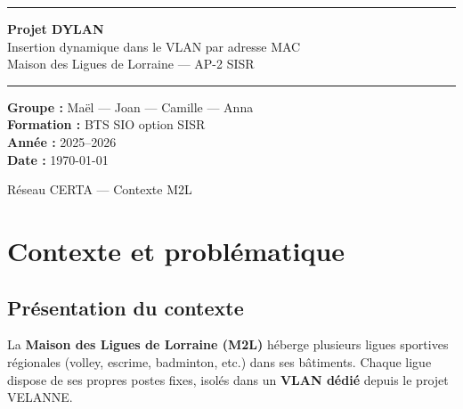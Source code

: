 \documentclass[a4paper,12pt]{article}
\begin{document}
\thispagestyle{empty}

\begin{center}
  \vspace*{2cm}
  {\color{primary}\rule{\textwidth}{2pt}}
  \vspace{0.8em}

  {\Huge\bfseries\sffamily\color{primary} Projet DYLAN}\\[0.4em]
  {\Large\sffamily\color{darkgray} Insertion dynamique dans le VLAN par adresse MAC}\\[0.2em]
  {\normalsize\color{darkgray} Maison des Ligues de Lorraine — AP-2 SISR}

  \vspace{0.8em}
  {\color{primary}\rule{\textwidth}{2pt}}

  \vspace{2cm}

  \begin{tcolorbox}[colback=lightgray, colframe=primary!30, sharp corners, width=0.7\textwidth]
    \centering
    \textbf{Groupe :} Maël — Joan — Camille — Anna\\[0.3em]
    \textbf{Formation :} BTS SIO option SISR\\[0.3em]
    \textbf{Année :} 2025–2026\\[0.3em]
    \textbf{Date :} \today
  \end{tcolorbox}
\end{center}

\vfill
{\small\color{darkgray}\centering Réseau CERTA — Contexte M2L\par}

\newpage
\tableofcontents
\newpage

\section{Contexte et problématique}

\subsection{Présentation du contexte}

La \textbf{Maison des Ligues de Lorraine (M2L)} héberge plusieurs ligues sportives régionales
(volley, escrime, badminton, etc.) dans ses bâtiments. Chaque ligue dispose de ses propres
postes fixes, isolés dans un \textbf{VLAN dédié} depuis le projet VELANNE.
\end{document}
